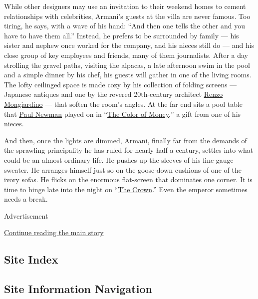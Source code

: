 While other designers may use an invitation to their weekend homes to
cement relationships with celebrities, Armani's guests at the villa are
never famous. Too tiring, he says, with a wave of his hand: ``And then
one tells the other and you have to have them all.'' Instead, he prefers
to be surrounded by family --- his sister and nephew once worked for the
company, and his nieces still do --- and his close group of key
employees and friends, many of them journalists. After a day strolling
the gravel paths, visiting the alpacas, a late afternoon swim in the
pool and a simple dinner by his chef, his guests will gather in one of
the living rooms. The lofty ceilinged space is made cozy by his
collection of folding screens --- Japanese antiques and one by the
revered 20th-century architect
\href{https://www.nytimes.com/2016/04/06/t-magazine/renzo-mongiardino-architect.html}{Renzo
Mongiardino} --- that soften the room's angles. At the far end sits a
pool table that
\href{https://www.nytimes.com/2008/09/28/movies/28newman.html}{Paul
Newman} played on in
``\href{https://www.nytimes.com/1986/10/17/movies/screen-paul-newman-in-the-color-of-money.html}{The
Color of Money},'' a gift from one of his nieces.

And then, once the lights are dimmed, Armani, finally far from the
demands of the sprawling principality he has ruled for nearly half a
century, settles into what could be an almost ordinary life. He pushes
up the sleeves of his fine-gauge sweater. He arranges himself just so on
the goose-down cushions of one of the ivory sofas. He flicks on the
enormous flat-screen that dominates one corner. It is time to binge late
into the night on
``\href{https://www.nytimes.com/2017/12/07/arts/television/the-crown-season-2-review.html?action=click\&contentCollection=Television\&module=RelatedCoverage\&region=EndOfArticle\&pgtype=article}{The
Crown}.'' Even the emperor sometimes needs a break.

Advertisement

\protect\hyperlink{after-bottom}{Continue reading the main story}

\hypertarget{site-index}{%
\subsection{Site Index}\label{site-index}}

\hypertarget{site-information-navigation}{%
\subsection{Site Information
Navigation}\label{site-information-navigation}}

